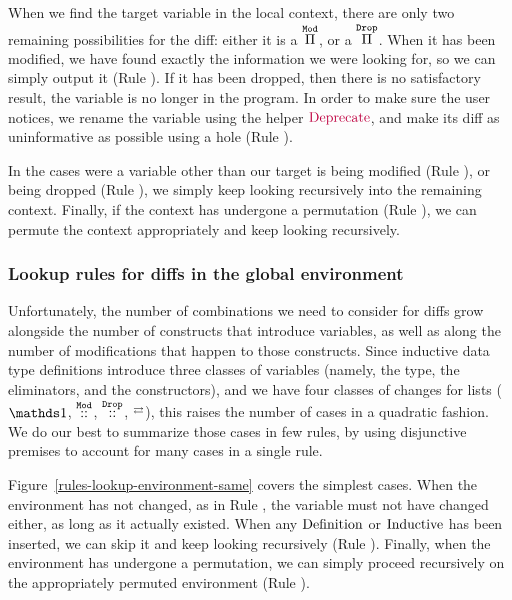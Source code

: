 When we find the target variable in the local context, there are only two
remaining possibilities for the diff: either it is a $\overset{\mathtt{Mod}}{\Pi}$, or a
$\overset{\mathtt{Drop}}{\Pi}$.  When it has been modified, we have found exactly the
information we were looking for, so we can simply output it (Rule
).  If it has been dropped, then there is no
satisfactory result, the variable is no longer in the program.  In order to make
sure the user notices, we rename the variable using the helper
$\textcolor{purple}{\text{Deprecate}}$, and make its diff as uninformative as possible using a
hole (Rule ).

In the cases were a variable other than our target is being modified (Rule
), or being dropped (Rule
), we simply keep looking recursively into the
remaining context.  Finally, if the context has undergone a permutation (Rule
), we can permute the context appropriately and keep
looking recursively.

\subsubsection{Lookup rules for diffs in the global environment}

Unfortunately, the number of combinations we need to consider for diffs grow
alongside the number of constructs that introduce variables, as well as along
the number of modifications that happen to those constructs.  Since inductive
data type definitions introduce three classes of variables (namely, the type,
the eliminators, and the constructors), and we have four classes of changes for
lists ($\MathSame{}$, $\overset{\mathtt{Mod}}{::}$, $\overset{\mathtt{Drop}}{::}$, $\overset{\overset{}{\rightleftarrows}}{}$), this
raises the number of cases in a quadratic fashion.  We do our best to summarize
those cases in few rules, by using disjunctive premises to account for many
cases in a single rule.

Figure~\ref{rules-lookup-environment-same} covers the simplest cases.  When the
environment has not changed, as in Rule , the variable
must not have changed either, as long as it actually existed.  When any
$\text{Definition}{}$ or $\text{Inductive}{}$ has been inserted, we can skip it and
keep looking recursively (Rule ).  Finally, when the
environment has undergone a permutation, we can simply proceed recursively on
the appropriately permuted environment (Rule ).

